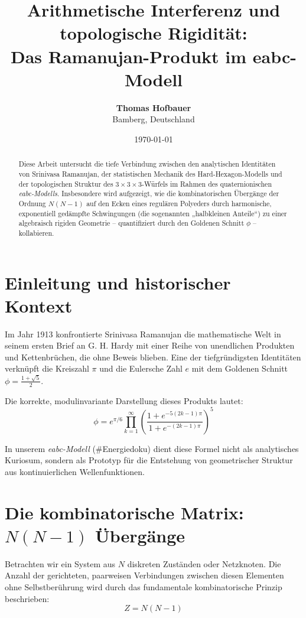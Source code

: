 \documentclass[11pt,a4paper]{article}
\title{\textbf{Arithmetische Interferenz und topologische Rigidität: \\ 
		Das Ramanujan-Produkt im eabc-Modell}}
\author{\textbf{Thomas Hofbauer} \\ \small Bamberg, Deutschland}
\date{\today}
\begin{document}
	
	\maketitle
	
	\begin{abstract}
		Diese Arbeit untersucht die tiefe Verbindung zwischen den analytischen Identitäten von Srinivasa Ramanujan, der statistischen Mechanik des Hard-Hexagon-Modells und der topologischen Struktur des $3\times3\times3$-Würfels im Rahmen des quaternionischen \textit{eabc-Modells}. Insbesondere wird aufgezeigt, wie die kombinatorischen Übergänge der Ordnung $N(N-1)$ auf den Ecken eines regulären Polyeders durch harmonische, exponentiell gedämpfte Schwingungen (die sogenannten „halbkleinen Anteile“) zu einer algebraisch rigiden Geometrie – quantifiziert durch den Goldenen Schnitt $\phi$ – kollabieren.
	\end{abstract}
	
	\section{Einleitung und historischer Kontext}
	Im Jahr 1913 konfrontierte Srinivasa Ramanujan die mathematische Welt in seinem ersten Brief an G. H. Hardy mit einer Reihe von unendlichen Produkten und Kettenbrüchen, die ohne Beweis blieben. Eine der tiefgründigsten Identitäten verknüpft die Kreiszahl $\pi$ und die Eulersche Zahl $e$ mit dem Goldenen Schnitt $\phi = \frac{1+\sqrt{5}}{2}$.
	
	Die korrekte, modulinvariante Darstellung dieses Produkts lautet:
	\begin{equation}
		\phi = e^{\pi/6} \prod_{k=1}^{\infty} \left( \frac{1 + e^{-5(2k-1)\pi}}{1 + e^{-(2k-1)\pi}} \right)^{5}
	\end{equation}
	
	In unserem \textit{eabc-Modell} (\#Energiedoku) dient diese Formel nicht als analytisches Kuriosum, sondern als Prototyp für die Entstehung von geometrischer Struktur aus kontinuierlichen Wellenfunktionen.
	
	\section{Die kombinatorische Matrix: $N(N-1)$ Übergänge}
	Betrachten wir ein System aus $N$ diskreten Zuständen oder Netzknoten. Die Anzahl der gerichteten, paarweisen Verbindungen zwischen diesen Elementen ohne Selbstberührung wird durch das fundamentale kombinatorische Prinzip beschrieben:
	\begin{equation}
		Z = N(N-1)
	\end{equation}
	
\end{document}
